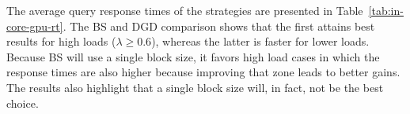 
The average query response times of the strategies are presented in 
Table~\ref{tab:in-core-gpu-rt}. The BS and DGD comparison shows that
the first attains best results for high loads ($\lambda \geq 0.6$), whereas
the latter is faster for lower loads. Because BS will use a single block size,
it favors high load cases in which the response times are also higher because
improving that zone leads to better gains. The results also highlight that
a single block size will, in fact, not be the best choice.

